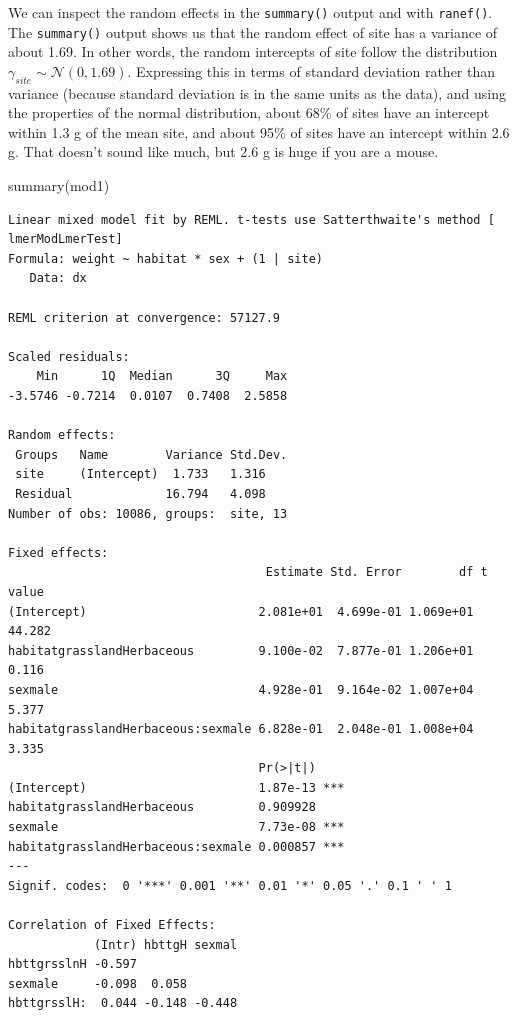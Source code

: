 \documentclass[
  13,
  letterpaper,
]{report}
\newenvironment{Shaded}{\begin{snugshade}}{\end{snugshade}}
\newcommand{\FunctionTok}[1]{\textcolor[rgb]{0.28,0.35,0.67}{#1}}
\newcommand{\NormalTok}[1]{\textcolor[rgb]{0.00,0.23,0.31}{#1}}
\begin{document}
We can inspect the random effects in the \texttt{summary()} output and
with \texttt{ranef()}. The \texttt{summary()} output shows us that the
random effect of site has a variance of about 1.69. In other words, the
random intercepts of site follow the distribution
\(\gamma_{site}\sim\mathcal{N}\left(0,1.69\right)\). Expressing this in
terms of standard deviation rather than variance (because standard
deviation is in the same units as the data), and using the properties of
the normal distribution, about 68\% of sites have an intercept within
1.3 g of the mean site, and about 95\% of sites have an intercept within
2.6 g. That doesn't sound like much, but 2.6 g is huge if you are a
mouse.

\begin{Shaded}
\begin{Highlighting}[]
\FunctionTok{summary}\NormalTok{(mod1)}
\end{Highlighting}
\end{Shaded}

\begin{verbatim}
Linear mixed model fit by REML. t-tests use Satterthwaite's method [
lmerModLmerTest]
Formula: weight ~ habitat * sex + (1 | site)
   Data: dx

REML criterion at convergence: 57127.9

Scaled residuals: 
    Min      1Q  Median      3Q     Max 
-3.5746 -0.7214  0.0107  0.7408  2.5858 

Random effects:
 Groups   Name        Variance Std.Dev.
 site     (Intercept)  1.733   1.316   
 Residual             16.794   4.098   
Number of obs: 10086, groups:  site, 13

Fixed effects:
                                    Estimate Std. Error        df t value
(Intercept)                        2.081e+01  4.699e-01 1.069e+01  44.282
habitatgrasslandHerbaceous         9.100e-02  7.877e-01 1.206e+01   0.116
sexmale                            4.928e-01  9.164e-02 1.007e+04   5.377
habitatgrasslandHerbaceous:sexmale 6.828e-01  2.048e-01 1.008e+04   3.335
                                   Pr(>|t|)    
(Intercept)                        1.87e-13 ***
habitatgrasslandHerbaceous         0.909928    
sexmale                            7.73e-08 ***
habitatgrasslandHerbaceous:sexmale 0.000857 ***
---
Signif. codes:  0 '***' 0.001 '**' 0.01 '*' 0.05 '.' 0.1 ' ' 1

Correlation of Fixed Effects:
            (Intr) hbttgH sexmal
hbttgrsslnH -0.597              
sexmale     -0.098  0.058       
hbttgrsslH:  0.044 -0.148 -0.448
\end{verbatim}
\end{document}
